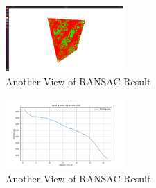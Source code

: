 \documentclass[../report.tex]{subfiles}
\begin{document}
\begin{figure}[H]
    \centering
    \includegraphics[width=0.4\textwidth]{rnd-project-report-main/figures/RANSAC.png}
    \caption{Another View of RANSAC Result}
\end{figure}

\begin{figure}[H]
    \centering
    \includegraphics[width=0.4\textwidth]{rnd-project-report-main/figures/training_loss_vs_time.png}
    \caption{Another View of RANSAC Result}
\end{figure}
\end{document}
